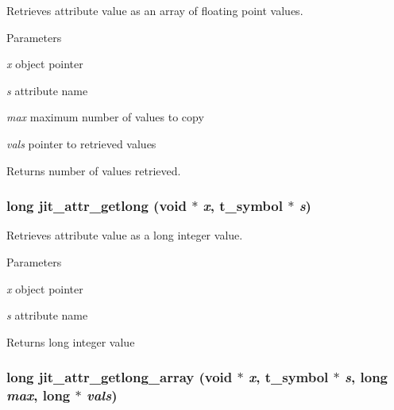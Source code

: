 Retrieves attribute value as an array of floating point values. 
\begin{DoxyParams}{Parameters}
\item[{\em x}]object pointer \item[{\em s}]attribute name \item[{\em max}]maximum number of values to copy \item[{\em vals}]pointer to retrieved values\end{DoxyParams}
\begin{DoxyReturn}{Returns}
number of values retrieved. 
\end{DoxyReturn}
\hypertarget{group__attrmod_gaac1ed292f21de902e64b4a04ad00e2d5}{
\subsubsection[{jit\_\-attr\_\-getlong}]{\setlength{\rightskip}{0pt plus 5cm}long jit\_\-attr\_\-getlong (void $\ast$ {\em x}, \/  {\bf t\_\-symbol} $\ast$ {\em s})}}
\label{group__attrmod_gaac1ed292f21de902e64b4a04ad00e2d5}


Retrieves attribute value as a long integer value. 
\begin{DoxyParams}{Parameters}
\item[{\em x}]object pointer \item[{\em s}]attribute name\end{DoxyParams}
\begin{DoxyReturn}{Returns}
long integer value 
\end{DoxyReturn}
\hypertarget{group__attrmod_gae0183a2a3b6e01c510982ca459d81042}{
\subsubsection[{jit\_\-attr\_\-getlong\_\-array}]{\setlength{\rightskip}{0pt plus 5cm}long jit\_\-attr\_\-getlong\_\-array (void $\ast$ {\em x}, \/  {\bf t\_\-symbol} $\ast$ {\em s}, \/  long {\em max}, \/  long $\ast$ {\em vals})}}
\label{group__attrmod_gae0183a2a3b6e01c510982ca459d81042}


